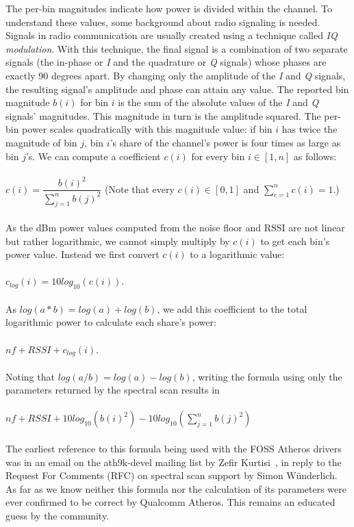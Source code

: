 \documentclass[a4paper, 11pt]{article}
\begin{document}
The per-bin magnitudes indicate how power is divided within the channel. To understand these values, some background about radio signaling is needed. Signals in radio communication are usually created using a technique called \textit{IQ modulation}. With this technique, the final signal is a combination of two separate signals (the in-phase or \textit{I} and the quadrature or \textit{Q} signals) whose phases are exactly 90 degrees apart. By changing only the amplitude of the \textit{I} and \textit{Q} signals, the resulting signal's amplitude and phase can attain any value. The reported bin magnitude $b(i)$ for bin $i$ is the sum of the absolute values of the \textit{I} and \textit{Q} signals' magnitudes. This magnitude in turn is the amplitude squared. The per-bin power scales quadratically with this magnitude value: if bin $i$ has twice the magnitude of bin $j$, bin $i$'s share of the channel's power is four times as large as bin $j$'s. We can compute a coefficient $c(i)$ for every bin $i \in [1,n]$ as follows:\\\\\hspace*{1.5em}$c(i) = \dfrac{b(i)^2}{\sum\limits_{j=1}^{n}b(j)^2}$ (Note that every $c(i) \in [0,1]$ and $\sum\limits_{c=1}^{n}{c(i)} = 1$.) \\\\
As the dBm power values computed from the noise floor and RSSI are not linear but rather logarithmic, we cannot simply multiply by $c(i)$ to get each bin's power value. Instead we first convert $c(i)$ to a logarithmic value: \\ \\ $c_{log}(i) = 10 log_{10}(c(i))$. \\ \\ As $log(a*b) = log(a) + log(b)$, we add this coefficient to the total logarithmic power to calculate each share's power:\\ \\ $nf + RSSI + c_{log}(i)$.\\ \\ Noting that $log(a/b) = log(a) - log(b)$, writing the formula using only the parameters returned by the spectral scan results in\\ \\ $nf + RSSI  + 10 log_{10}(b(i)^2) - 10 log_{10}(\sum\limits_{j=1}^{n}{b(j)^2})$ \\ \\
The earliest reference to this formula being used with the FOSS Atheros drivers was in an email on the ath9k-devel mailing list by Zefir Kurtisi~\cite{formula}, in reply to the Request For Comments (RFC) on spectral scan support by Simon W{\"u}nderlich. As far as we know neither this formula nor the calculation of its parameters were ever confirmed to be correct by Qualcomm Atheros. This remains an educated guess by the community.
\end{document}
